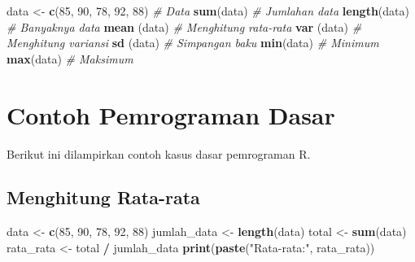 \documentclass[
]{book}
\newenvironment{Shaded}{\begin{snugshade}}{\end{snugshade}}
\newcommand{\CommentTok}[1]{\textcolor[rgb]{0.56,0.35,0.01}{\textit{#1}}}
\newcommand{\DecValTok}[1]{\textcolor[rgb]{0.00,0.00,0.81}{#1}}
\newcommand{\FunctionTok}[1]{\textcolor[rgb]{0.13,0.29,0.53}{\textbf{#1}}}
\newcommand{\NormalTok}[1]{#1}
\newcommand{\OtherTok}[1]{\textcolor[rgb]{0.56,0.35,0.01}{#1}}
\newcommand{\SpecialCharTok}[1]{\textcolor[rgb]{0.81,0.36,0.00}{\textbf{#1}}}
\newcommand{\StringTok}[1]{\textcolor[rgb]{0.31,0.60,0.02}{#1}}
\begin{document}
\begin{Shaded}
\begin{Highlighting}[]
\NormalTok{data }\OtherTok{\textless{}{-}} \FunctionTok{c}\NormalTok{(}\DecValTok{85}\NormalTok{, }\DecValTok{90}\NormalTok{, }\DecValTok{78}\NormalTok{, }\DecValTok{92}\NormalTok{, }\DecValTok{88}\NormalTok{)  }\CommentTok{\# Data}
\FunctionTok{sum}\NormalTok{(data)                      }\CommentTok{\# Jumlahan data}
\FunctionTok{length}\NormalTok{(data)                   }\CommentTok{\# Banyaknya data}
\FunctionTok{mean}\NormalTok{ (data)                      }\CommentTok{\# Menghitung rata{-}rata}
\FunctionTok{var}\NormalTok{ (data)                     }\CommentTok{\# Menghitung variansi}
\FunctionTok{sd}\NormalTok{ (data)                        }\CommentTok{\# Simpangan baku}
\FunctionTok{min}\NormalTok{(data)                      }\CommentTok{\# Minimum}
\FunctionTok{max}\NormalTok{(data)                      }\CommentTok{\# Maksimum}
\end{Highlighting}
\end{Shaded}

\hypertarget{contoh-pemrograman-dasar}{%
\section{Contoh Pemrograman Dasar}\label{contoh-pemrograman-dasar}}

Berikut ini dilampirkan contoh kasus dasar pemrograman R.

\hypertarget{menghitung-rata-rata}{%
\subsection{Menghitung Rata-rata}\label{menghitung-rata-rata}}

\begin{Shaded}
\begin{Highlighting}[]
\NormalTok{data }\OtherTok{\textless{}{-}} \FunctionTok{c}\NormalTok{(}\DecValTok{85}\NormalTok{, }\DecValTok{90}\NormalTok{, }\DecValTok{78}\NormalTok{, }\DecValTok{92}\NormalTok{, }\DecValTok{88}\NormalTok{)}
\NormalTok{jumlah\_data }\OtherTok{\textless{}{-}} \FunctionTok{length}\NormalTok{(data)}
\NormalTok{total }\OtherTok{\textless{}{-}} \FunctionTok{sum}\NormalTok{(data)}
\NormalTok{rata\_rata }\OtherTok{\textless{}{-}}\NormalTok{ total }\SpecialCharTok{/}\NormalTok{ jumlah\_data}
\FunctionTok{print}\NormalTok{(}\FunctionTok{paste}\NormalTok{(}\StringTok{"Rata{-}rata:"}\NormalTok{, rata\_rata))}
\end{Highlighting}
\end{Shaded}
\end{document}
